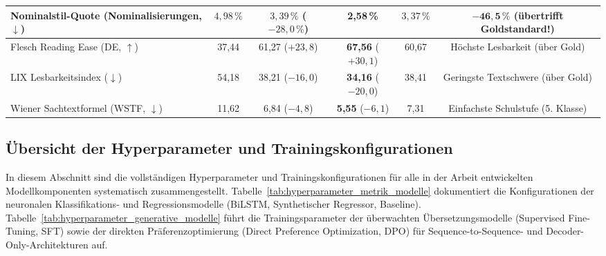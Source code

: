 \begin{table}[htbp]
{\begin{tabular}{@{}lccccc@{}}
Nominalstil-Quote (Nominalisierungen, $\downarrow$) & $4{,}98\,\%$ & $3{,}39\,\%$ ($-28{,}0\,\%$) & \textbf{2,58\,\%} & $3{,}37\,\%$ & $\mathbf{-46{,}5\,\%}$ (übertrifft Goldstandard!) \\
\midrule
Flesch Reading Ease (DE, $\uparrow$) & 37,44 & 61,27 ($+23{,}8$) & \textbf{67,56} ($+30{,}1$) & 60,67 & Höchste Lesbarkeit (über Gold) \\
LIX Lesbarkeitsindex ($\downarrow$) & 54,18 & 38,21 ($-16{,}0$) & \textbf{34,16} ($-20{,}0$) & 38,41 & Geringste Textschwere (über Gold) \\
Wiener Sachtextformel (WSTF, $\downarrow$) & 11,62 & 6,84 ($-4{,}8$) & \textbf{5,55} ($-6{,}1$) & 7,31 & Einfachste Schulstufe (5. Klasse) \\
\bottomrule
\end{tabular}}
\end{table}

\newpage
\subsection{Übersicht der Hyperparameter und Trainingskonfigurationen}
\label{sec:anhang_hyperparameter}

In diesem Abschnitt sind die vollständigen Hyperparameter und Trainingskonfigurationen für alle in der Arbeit entwickelten Modellkomponenten systematisch zusammengestellt. Tabelle~\ref{tab:hyperparameter_metrik_modelle} dokumentiert die Konfigurationen der neuronalen Klassifikations- und Regressionsmodelle (BiLSTM, Synthetischer Regressor, Baseline). Tabelle~\ref{tab:hyperparameter_generative_modelle} führt die Trainingsparameter der überwachten Übersetzungsmodelle (Supervised Fine-Tuning, SFT) sowie der direkten Präferenzoptimierung (Direct Preference Optimization, DPO) für Sequence-to-Sequence- und Decoder-Only-Architekturen auf.

